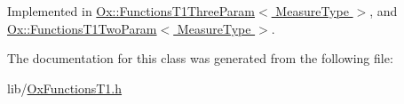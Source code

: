 Implemented in \hyperlink{class_ox_1_1_functions_t1_three_param_ab4a91ffbef69e36dc0b521c149f95481}{Ox\-::\-Functions\-T1\-Three\-Param$<$ Measure\-Type $>$}, and \hyperlink{class_ox_1_1_functions_t1_two_param_a023a84c85a09fd184e50980778aaf0fb}{Ox\-::\-Functions\-T1\-Two\-Param$<$ Measure\-Type $>$}.



The documentation for this class was generated from the following file\-:\begin{DoxyCompactItemize}
\item 
lib/\hyperlink{_ox_functions_t1_8h}{Ox\-Functions\-T1.\-h}\end{DoxyCompactItemize}
